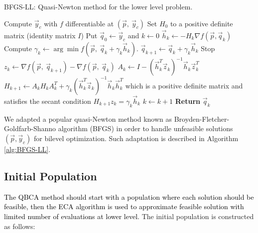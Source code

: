 \documentclass[conference]{IEEEtran}
\theoremstyle{definition}
\begin{document}
\begin{algorithm}[!ht]
    \caption{BFGS-LL: Quasi-Newton method for the lower level problem.}
    \label{alg:BFGS-LL}
    \begin{algorithmic}[1]
        \STATE Compute $\vec{y}_c$ with $f$ differentiable at $(\vec{p},\ \vec{y}_c)$
        \STATE Set $H_0$ to a positive definite matrix (identity matrix $I$)
        \STATE Put $\vec{q}_0 \gets \vec{y}_c$ and $k \gets 0$
            \STATE $\vec{h}_k \gets -H_k\nabla f(\vec{p}, \vec{q}_k)$
            \STATE Compute $\gamma_{k}\gets\arg \min f(\vec{p}, \ \vec{q} _{k}+ \gamma_k \vec{h} _{k})$.
            \STATE $\vec{q}_{k+1} \gets \vec{q}_k  + \gamma_k \vec{h}_k$
                \STATE Stop
            \ENDIF
            \STATE $z_k \gets \nabla f(\vec{p}, \ \vec{q}_{k+1}) - \nabla f(\vec{p}, \ \vec{q}_{k}) $
            \STATE $\displaystyle A_k \gets I - (\vec{h}_k^T \vec{z}_k)^{-1} \vec{h}_k \vec{z}_k^T$
            \STATE $H_{k+1} \gets A_k H_k A_k^T + \gamma_k(\vec{h}_k^T\vec{z}_k)^{-1}\vec{h}_k \vec{h}_k^T$
                   which is a positive definite matrix and satisfies the secant
                   condition $H_{k+1} z_k = \gamma_k \vec{h}_k$
            \STATE $k \gets k + 1$
        \ENDWHILE
        \STATE \textbf{Return} $\vec{q}_k$
    \end{algorithmic}
\end{algorithm}

We adapted a popular quasi-Newton method known as Broyden-Fletcher-Goldfarb-Shanno
algorithm (BFGS) \cite{fletcher2013practical} in order to handle unfeasible
solutions $(\vec{p}, \vec{y}_c)$ for bilevel optimization. Such adaptation is
described in Algorithm \ref{alg:BFGS-LL}.
% 

\subsection{Initial Population} %
\label{sub:initial_population}

\textcolor{black}{
The QBCA method should start with a population where each solution  should
be feasible, then the ECA algorithm \cite{Mejia2018} is used to approximate feasible
solution with limited number of evaluations at lower level.
} The initial population is constructed as follows:
\end{document}
